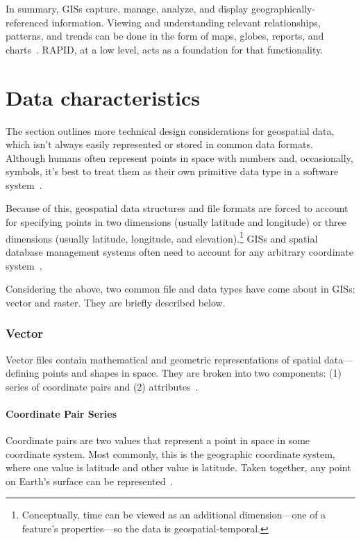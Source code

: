In summary, GISs capture, manage, analyze, and display geographically-referenced information. Viewing and understanding relevant relationships, patterns, and trends can be done in the form of maps, globes, reports, and charts~\cite{Esriintro}. RAPID, at a low level, acts as a foundation for that functionality.

\section{Data characteristics}
The section outlines more technical design considerations for geospatial data, which isn't always easily represented or stored in common data formats. Although humans often represent points in space with numbers and, occasionally, symbols, it's best to treat them as their own primitive data type in a software system~\cite{gentle_intro}.

Because of this, geospatial data structures and file formats are forced to account for specifying points in two dimensions (usually latitude and longitude) or three dimensions (usually latitude, longitude, and elevation).\footnote{Conceptually, time can be viewed as an additional dimension---one of a feature's properties---so the data is geospatial-temporal.} GISs and spatial database management systems often need to account for any arbitrary coordinate system~\cite{gentle_intro}.

Considering the above, two common file and data types have come about in GISs: vector and raster. They are briefly described below.

\subsubsection{Vector}
\label{sec:vector}
Vector files contain mathematical and geometric representations of spatial data---defining points and shapes in space. They are broken into two components: (1) series of coordinate pairs and (2) attributes~\cite{gentle_intro}.

\paragraph{Coordinate Pair Series}
Coordinate pairs are two values that represent a point in space in some coordinate system. Most commonly, this is the geographic coordinate system, where one value is latitude and other value is latitude. Taken together, any point on Earth's surface can be represented~\cite{gentle_intro}.

